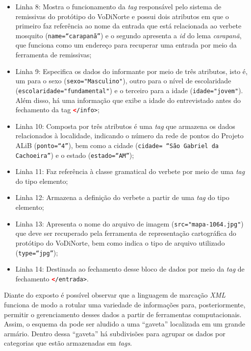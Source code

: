\documentclass[portuguese]{textolivre}
\begin{document}
\begin{itemize}
    \item Linha 8: Mostra o funcionamento da \emph{tag} responsável pelo sistema de remissivas do protótipo do VoDiNorte e possui dois atributos em que o primeiro faz referência ao nome da entrada que está relacionada ao verbete mosquito (\lstinline[language=XML]!name=“carapanã”!) e o segundo apresenta a \emph{id} do lema \emph{carapanã}, que funciona como um endereço para recuperar uma entrada por meio da ferramenta de remissivas; 
    \item Linha 9: Especifica os dados do informante por meio de três atributos, isto é, um para o sexo (\lstinline[language=XML]!sexo="Masculino"!), outro para o nível de escolaridade (\lstinline[language=XML]!escolaridade="fundamental"!) e o terceiro para a idade (\lstinline[language=XML]!idade="jovem"!). Além disso, há uma informação  que exibe a idade do entrevistado antes do fechamento da tag \lstinline[language=XML]!</info>!; 
    \item Linha 10: Composta por três atributos é uma \emph{tag} que armazena os dados relacionados à localidade, indicando o número da rede de pontos do Projeto ALiB (\lstinline[language=XML]!ponto=“4”!), bem como a cidade (\lstinline[language=XML]!cidade= “São Gabriel da Cachoeira”!) e o estado (\lstinline[language=XML]!estado=“AM”!);
    \item Linha 11: Faz referência à classe gramatical do verbete por meio de uma \emph{tag} do tipo elemento;
    \item Linha 12: Armazena a definição do verbete a partir de uma \emph{tag} do tipo elemento;
    \item Linha 13: Apresenta o nome do arquivo de imagem (\lstinline[language=XML]!src="mapa-1064.jpg"!) que deve ser recuperado pela ferramenta de representação cartográfica do protótipo do VoDiNorte, bem como indica o tipo de arquivo utilizado (\lstinline[language=XML]!type=“jpg”!);
    \item Linha 14: Destinada ao fechamento desse bloco de dados por meio da \emph{tag} de fechamento \lstinline[language=XML]!</entrada>!. 
\end{itemize}

Diante do exposto é possível observar que a linguagem de marcação \emph{XML} funciona de modo a rotular uma variedade de informações para, posteriormente, permitir o gerenciamento desses dados a partir de ferramentas computacionais. Assim, o esquema da  pode ser aludido a uma “gaveta” localizada em um grande armário. Dentro dessa “gaveta” há subdivisões para agrupar os dados por categorias que estão armazenadas em \emph{tags}. 
\end{document}
